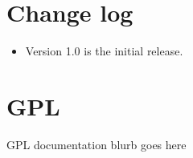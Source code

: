 \documentclass[12pt]{article}
\begin{document}
\appendix
\section{Change log}

\begin{itemize}
\item Version 1.0 is the initial release.
 \end{itemize}


\section{GPL}

GPL documentation blurb goes here




\end{document}
